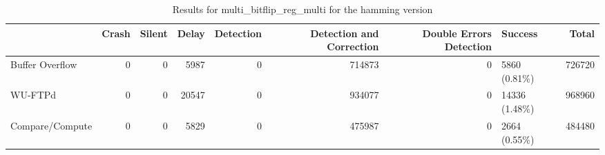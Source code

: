 \begin{table}[t]
	\centering
	\caption{Results for multi_bitflip_reg_multi for the hamming version}
	\label{table:end_sim_by_status_hamming_5_multi_bitflip_reg_multi}
	\begin{tabular}{lrrrrrrlr}
		\toprule
		                & Crash & Silent & Delay & Detection & Detection and Correction & Double Errors Detection & Success        & Total  \\
		\midrule
		Buffer Overflow & 0     & 0      & 5987  & 0         & 714873                   & 0                       & 5860 (0.81\%)  & 726720 \\
		WU-FTPd         & 0     & 0      & 20547 & 0         & 934077                   & 0                       & 14336 (1.48\%) & 968960 \\
		Compare/Compute & 0     & 0      & 5829  & 0         & 475987                   & 0                       & 2664 (0.55\%)  & 484480 \\
		\bottomrule
	\end{tabular}
\end{table}
